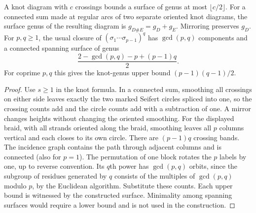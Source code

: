 \begin{corollary}
A knot diagram with $c$ crossings bounds a surface of genus at most
$\lfloor c/2\rfloor$. For a connected sum made at regular arcs of two
separate oriented knot diagrams, the surface genus of the resulting
diagram is $g_{D\#E}=g_D+g_E$. Mirroring preserves $g_D$. For $p,q\ge1$,
the usual closure of $(\sigma_1\cdots\sigma_{p-1})^q$ has
$\gcd(p,q)$ components and a connected spanning surface of genus
\[
   \frac{2-\gcd(p,q)-p+(p-1)q}{2}.
\]
For coprime $p,q$ this gives the knot-genus upper bound
$(p-1)(q-1)/2$.
\end{corollary}
\begin{proof}
Use $s\ge1$ in the knot formula. In a connected sum, smoothing all
crossings on either side leaves exactly the two marked Seifert circles
spliced into one, so the crossing counts add and the circle counts add
with a subtraction of one. A mirror changes heights without changing
the oriented smoothing. For the displayed braid, with all strands
oriented along the braid, smoothing leaves all $p$ columns vertical and
each closes to its own circle. There are $(p-1)q$ crossing bands.
The incidence graph contains the path through adjacent columns and is
connected (also for $p=1$). The permutation of one block rotates the
$p$ labels by one, up to reverse convention. Its $q$th power has
$\gcd(p,q)$ orbits, since the subgroup of residues generated by $q$
consists of the multiples of $\gcd(p,q)$ modulo $p$, by the Euclidean
algorithm. Substitute these counts. Each upper bound is witnessed by the
constructed surface. Minimality among spanning surfaces would require a
lower bound and is not used in the construction.
\end{proof}

